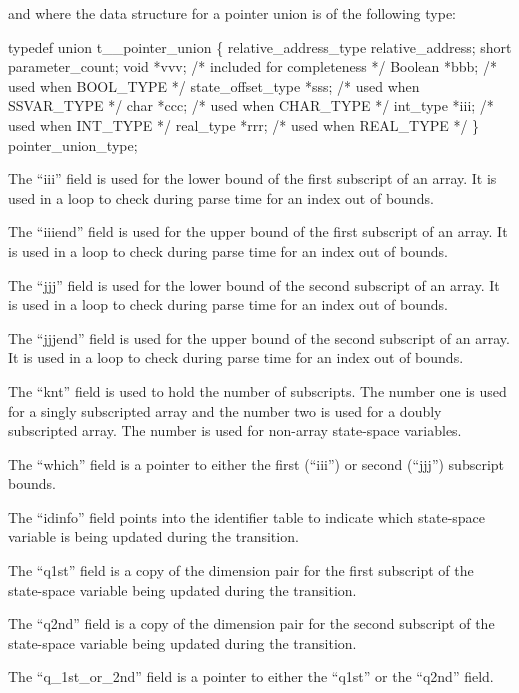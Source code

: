 and where the data structure for a pointer union is of the following type:
\begin{codeexample}
typedef union t__pointer_union
   \{
     relative_address_type relative_address;
     short parameter_count;
     void *vvv;               /* included for completeness */
     Boolean *bbb;            /* used when BOOL_TYPE */
     state_offset_type *sss;  /* used when SSVAR_TYPE */
     char *ccc;               /* used when CHAR_TYPE */
     int_type *iii;           /* used when INT_TYPE */
     real_type *rrr;          /* used when REAL_TYPE */
   \} pointer_union_type;
\end{codeexample}



The ``iii'' field is used for the lower bound of the first subscript of an
array.
It is used in a loop to check during parse time for an index out of bounds.

The ``iiiend'' field is used for the upper bound of the first subscript of
an array.
It is used in a loop to check during parse time for an index out of bounds.

The ``jjj'' field is used for the lower bound of the second subscript of
an array.
It is used in a loop to check during parse time for an index out of bounds.

The ``jjjend'' field is used for the upper bound of the second subscript of
an array.
It is used in a loop to check during parse time for an index out of bounds.

The ``knt'' field is used to hold the number of subscripts.   The number
one is used for a singly subscripted array and the number two is used
for a doubly subscripted array.   The number  is
used for non-array state-space variables.

The ``which'' field is a pointer to either
the first (``iii'') or second (``jjj'') subscript bounds.

The ``idinfo'' field points into the identifier table to indicate which
state-space variable is being updated during the transition.

The ``q1st'' field is a copy of the dimension pair for the first subscript
of the state-space variable being updated during the transition.

The ``q2nd'' field is a copy of the dimension pair for the second subscript
of the state-space variable being updated during the transition.

The ``q\_1st\_or\_2nd'' field is a pointer to either
the ``q1st'' or the ``q2nd'' field.

